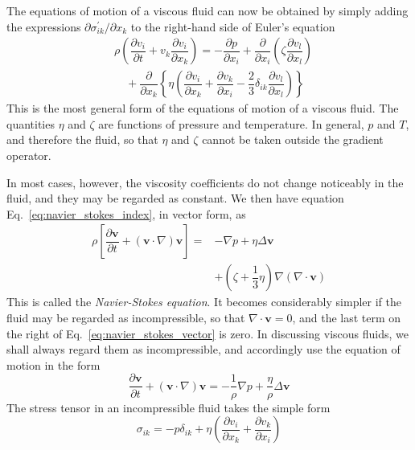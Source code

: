 \documentclass[conference]{IEEEtran}
\theoremstyle{definition}
\theoremstyle{remark}
\begin{document}
    The equations of motion of a viscous fluid can now be obtained by simply adding the expressions $\partial \sigma^\prime_{ik} / \partial x_k$ to the right-hand side of Euler's equation
    \begin{align}
        & \rho \left( \dfrac{\partial v_i}{\partial t} + v_k \dfrac{\partial v_i}{\partial x_k} \right) = -\dfrac{\partial p}{\partial x_i} + \dfrac{\partial}{\partial x_i} \left( \zeta \dfrac{\partial v_l}{\partial x_l} \right) \nonumber \\ 
        & \quad + \dfrac{\partial}{\partial x_k} \left\{ \eta \left( \dfrac{\partial v_i}{\partial x_k} + \dfrac{\partial v_k}{\partial x_i} -\dfrac23 \delta_{ik} \dfrac{\partial v_l}{\partial x_l} \right) \right\}
        \label{eq:navier_stokes_index}
    \end{align}
    This is the most general form of the equations of motion of a viscous fluid. The quantities $\eta$ and $\zeta$ are functions of pressure and temperature. In general, $p$ and $T$, and therefore the fluid, so that $\eta$ and $\zeta$ cannot be taken outside the gradient operator.

    In most cases, however, the viscosity coefficients do not change noticeably in the fluid, and they may be regarded as constant. We then have equation Eq.~\ref{eq:navier_stokes_index}, in vector form, as
    \begin{align}
        \rho \left[ \dfrac{\partial \mathbf{v}}{\partial t} + (\mathbf{v} \cdot \nabla) \mathbf{v} \right] =& -\nabla p + \eta \Delta \mathbf{v} \nonumber \\
        & + (\zeta + \dfrac13 \eta) \nabla (\nabla \cdot \mathbf{v})
        \label{eq:navier_stokes_vector}
    \end{align}
    This is called the \emph{Navier-Stokes equation}. It becomes considerably simpler if the fluid may be regarded as incompressible, so that $\nabla \cdot \mathbf{v} = 0$, and the last term on the right of Eq.~\ref{eq:navier_stokes_vector} is zero. In discussing viscous fluids, we shall always regard them as incompressible, and accordingly use the equation of motion in the form
    \begin{equation}
        \dfrac{\partial \mathbf{v}}{\partial t} + (\mathbf{v} \cdot \nabla) \mathbf{v} = -\dfrac1\rho \nabla p + \dfrac{\eta}{\rho} \Delta \mathbf{v}
        \label{eq:ns_impressible}
    \end{equation}
    The stress tensor in an incompressible fluid takes the simple form
    \begin{equation}
        \sigma_{ik} = - p \delta_{ik} + \eta \left( \dfrac{\partial v_i}{\partial x_k} + \dfrac{\partial v_k}{\partial x_i} \right)
    \end{equation}
\end{document}
